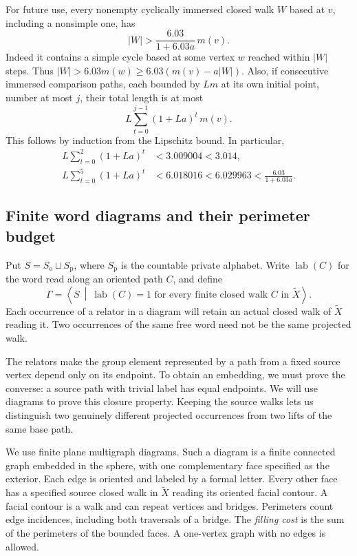 For future use, every nonempty cyclically immersed closed walk $W$ based
at $v$, including a nonsimple one, has
\begin{equation}\label{eq:closed-walk-lower}
 |W|>\frac{6.03}{1+6.03a}\,m(v).
\end{equation}
Indeed it contains a simple cycle based at some vertex $w$ reached within
$|W|$ steps.  Thus
$|W|>6.03m(w)\ge6.03(m(v)-a|W|)$.
Also, if consecutive immersed comparison paths, each bounded by $Lm$ at
its own initial point, number at most $j$, their total length is at most
\begin{equation}\label{eq:arc-geometric-sum}
 L\sum_{t=0}^{j-1}(1+La)^t\,m(v).
\end{equation}
This follows by induction from the Lipschitz bound.
In particular,
\begin{align}
 L\sum_{t=0}^2(1+La)^t&<3.009004<3.014,
 \label{eq:three-arcs}\\
 L\sum_{t=0}^5(1+La)^t&<6.018016
 <6.029963<\frac{6.03}{1+6.03a}.
 \label{eq:six-arcs}
\end{align}

\subsection{Finite word diagrams and their perimeter budget}

Put $S=S_{\mathrm o}\sqcup S_{\mathrm p}$, where $S_{\mathrm p}$ is the
countable private alphabet.  Write $\operatorname{lab}(C)$ for the word
read along an oriented path $C$, and define
\begin{equation}\label{eq:graphical-presentation}
 \Gamma=\left\langle S\ \middle|\
 \operatorname{lab}(C)=1\text{ for every finite closed walk }C\text{ in }\widetilde X
 \right\rangle.
\end{equation}
Each occurrence of a relator in a diagram will retain an actual closed
walk of $\widetilde X$ reading it.  Two occurrences of the same free word
need not be the same projected walk.

The relators make the group element represented by a path from a fixed
source vertex depend only on its endpoint.  To obtain an embedding, we
must prove the converse: a source path with trivial label has equal
endpoints.  We will use diagrams
to prove this closure property.  Keeping the source walks lets us distinguish
two genuinely different projected occurrences from two lifts of the same
base path.

We use finite plane multigraph diagrams.  Such a diagram is a finite
connected graph embedded in the sphere, with one complementary face
specified as the exterior.  Each edge is oriented and labeled by a formal
letter.  Every other face has a specified source closed walk in
$\widetilde X$ reading its oriented facial contour.  A facial contour is a
walk and can repeat vertices and bridges.  Perimeters count edge
incidences, including both traversals of a bridge.  The \emph{filling cost}
is the sum of the perimeters of the bounded faces.  A one-vertex graph
with no edges is allowed.

